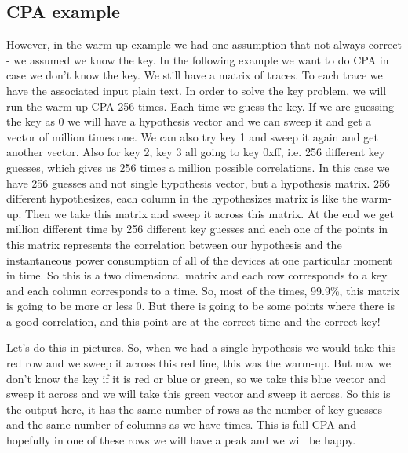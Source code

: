\subsection{CPA example}\label{c8_CPA_example:subsec}

However, in the warm-up example we had one assumption that not always correct -
we assumed we know the key. In the following example we want to do CPA in case
we don't know the key. We still have a matrix of traces. To each trace we have
the associated input plain text. In order to solve the key problem, we will run
the warm-up CPA 256 times. Each time we guess the key. If we are guessing the
key as 0 we will have a hypothesis vector and we can sweep it and get a vector
of million times one. We can also try key 1 and sweep it again and get another
vector. Also for key 2, key 3 all going to key 0xff, i.e. 256 different key
guesses, which gives us 256 times a million possible correlations. In this case
we have 256 guesses and not single hypothesis vector, but a hypothesis matrix.
256 different hypothesizes, each column in the hypothesizes matrix is like the
warm-up. Then we take this matrix and sweep it across this matrix. At the end we
get million different time by 256 different key guesses and each one of the
points in this matrix represents the correlation between our hypothesis and the
instantaneous power consumption of all of the devices at one particular moment
in time. So this is a two dimensional matrix and each row corresponds to a key
and each column corresponds to a time. So, most of the times, 99.9\%, this
matrix is going to be more or less 0. But there is going to be some points where
there is a good correlation, and this point are at the correct time and the
correct key!

Let's do this in pictures. So, when we had a single hypothesis we would take
this red row and we sweep it across this red line, this was the warm-up. But now
we don't know the key if it is red or blue or green, so we take this blue vector
and sweep it across and we will take this green vector and sweep it across. So
this is the output here, it has the same number of rows as the number of key
guesses and the same number of columns as we have times. This is full CPA and
hopefully in one of these rows we will have a peak and we will be happy. 

